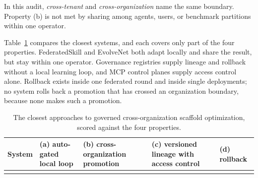 \documentclass[
  11pt,
]{article}
\newcounter{none} %
\begin{document}
In this audit, \emph{cross-tenant} and \emph{cross-organization} name the same boundary. Property (b) is not met by sharing among agents, users, or benchmark partitions within one operator.

Table~\ref{tab:IX-1} compares the closest systems, and each covers only part of the four properties. FederatedSkill \cite{yang2026federatedskill} and EvolveNet \cite{nie2026evolvenet} both adapt locally and share the result, but stay within one operator. Governance registries supply lineage and rollback without a local learning loop, and MCP control planes supply access control alone. Rollback exists inside one federated round and inside single deployments; no system rolls back a promotion that has crossed an organization boundary, because none makes such a promotion.

\begin{table}[htbp]
\caption{The closest approaches to governed cross-organization scaffold optimization, scored against the four properties.}\label{tab:IX-1}
\centering\small
\begin{tabular}{@{}
  >{\raggedright\arraybackslash}p{}
  >{\raggedright\arraybackslash}p{}
  >{\raggedright\arraybackslash}p{}
  >{\raggedright\arraybackslash}p{}
  >{\raggedright\arraybackslash}p{}@{}}
\toprule\noalign{}
\begin{minipage}[b]{\linewidth}\raggedright
System
\end{minipage} & \begin{minipage}[b]{\linewidth}\raggedright
(a) auto-gated local loop
\end{minipage} & \begin{minipage}[b]{\linewidth}\raggedright
(b) cross-organization promotion
\end{minipage} & \begin{minipage}[b]{\linewidth}\raggedright
(c) versioned lineage with access control
\end{minipage} & \begin{minipage}[b]{\linewidth}\raggedright
(d) rollback
\end{minipage} \\
\midrule\noalign{}



\end{tabular}
\end{table}
\end{document}
